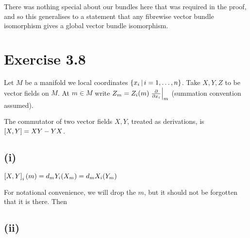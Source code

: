 \documentclass{article}
\begin{document}
\begin{remark}
There was nothing special about our bundles here that was required in the proof, and so this generalises to a statement that any fibrewise vector bundle isomorphism gives a global vector bundle isomorphism. 
\end{remark}

\section{Exercise 3.8}
Let $M$ be a manifold we local coordinates $\pbrace{x_i \, | \, i=1, \dots, n}$. Take $X,Y,Z$ to be vector fields on $M$. At $m \in M$ write $Z_m = Z_i(m) \ev{\pd{x_i}}{m}$ (summation convention assumed). 

\begin{definition}
The commutator of two vector fields $X,Y$, treated as derivations, is $\comm[X]{Y} = XY-YX$. 
\end{definition}
\subsection{(i)}

\begin{prop}
$\comm[X]{Y}_i(m) = d_m Y_i(X_m) = d_m X_i(Y_m)$
\end{prop}
\begin{prop}
For notational convenience, we will drop the $m$, but it should not be forgotten that it is there. Then
\end{prop}

\subsection{(ii)}
\end{document}
